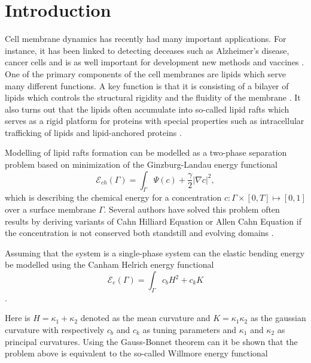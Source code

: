 \section{Introduction}\label{sec:introduction}


Cell membrane dynamics has recently had many important applications. For instance, it has been linked to detecting deceases such as Alzheimer's disease, cancer cells and is as well important for development new methods and vaccines
\cite{small2006sorting}.
One of the primary components of the cell membranes are lipids which serve many different functions. A key function is that it is consisting of a bilayer of lipids which controls the structural rigidity and the fluidity of the membrane \cite{ neidleman87}. It also turns out that the lipids often accumulate into so-called lipid rafts which serves as a rigid platform for proteins with special properties such as intracellular trafficking of lipids and lipid-anchored proteins \cite{Edidin03}.

Modelling of lipid rafts formation can be modelled as a two-phase separation problem based on minimization of the Ginzburg-Landau energy functional \cite{yushutin19}
\[
\mathcal{E}_{ch}  \left( \Gamma  \right) = \int_{\Gamma  }^{}\Psi \left( c \right) + \frac{\gamma}{2} \left\lvert \nabla c \right\rvert^{2} ,
\]
which is describing the chemical energy for a concentration $c: \Gamma \times \left[ 0,T \right] \mapsto  \left[ 0,1 \right]  $ over a surface membrane $\Gamma$. Several authors have solved this problem often results by deriving variants of Cahn
Hilliard Equation or Allen Cahn Equation if the concentration is not conserved both standstill and evolving domains \cite{yushutin19, udo97, ratz16,Gera2017, caetano21,yushutin19} .


Assuming that the system is a single-phase system can the elastic bending energy be modelled using the Canham Helrich energy functional \cite{wang08, udo97} \[
\mathcal{E} _{e}\left( \Gamma  \right) =   \int_{\Gamma }^{}  c_{b} H^{2} + c_{k} K
\].

Here is $H =  \kappa_1 + \kappa_2 $ denoted as the mean curvature and $K = \kappa_1 \kappa_2$ as the gaussian curvature with respectively $c_{b}$ and $c_{k}$ as tuning parameters and $\kappa_1$ and $\kappa_2$ as principal curvatures. Using the Gauss-Bonnet theorem can it be shown that the problem above is equivalent to the so-called Willmore energy
functional \cite{montiel2009curves, willmore1996riemannian}

